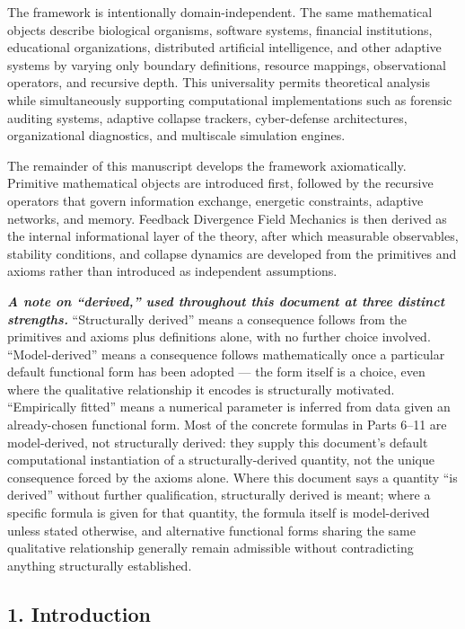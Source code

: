 \documentclass[
]{article}
\begin{document}
The framework is intentionally domain-independent. The same mathematical
objects describe biological organisms, software systems, financial
institutions, educational organizations, distributed artificial
intelligence, and other adaptive systems by varying only boundary
definitions, resource mappings, observational operators, and recursive
depth. This universality permits theoretical analysis while
simultaneously supporting computational implementations such as forensic
auditing systems, adaptive collapse trackers, cyber-defense
architectures, organizational diagnostics, and multiscale simulation
engines.

The remainder of this manuscript develops the framework axiomatically.
Primitive mathematical objects are introduced first, followed by the
recursive operators that govern information exchange, energetic
constraints, adaptive networks, and memory. Feedback Divergence Field
Mechanics is then derived as the internal informational layer of the
theory, after which measurable observables, stability conditions, and
collapse dynamics are developed from the primitives and axioms rather
than introduced as independent assumptions.

\emph{\textbf{A note on ``derived,'' used throughout this document at
three distinct strengths.}} ``Structurally derived'' means a consequence
follows from the primitives and axioms plus definitions alone, with no
further choice involved. ``Model-derived'' means a consequence follows
mathematically once a particular default functional form has been
adopted --- the form itself is a choice, even where the qualitative
relationship it encodes is structurally motivated. ``Empirically
fitted'' means a numerical parameter is inferred from data given an
already-chosen functional form. Most of the concrete formulas in Parts
6--11 are model-derived, not structurally derived: they supply this
document's default computational instantiation of a structurally-derived
quantity, not the unique consequence forced by the axioms alone. Where
this document says a quantity ``is derived'' without further
qualification, structurally derived is meant; where a specific formula
is given for that quantity, the formula itself is model-derived unless
stated otherwise, and alternative functional forms sharing the same
qualitative relationship generally remain admissible without
contradicting anything structurally established.

\hypertarget{introduction}{%
\subsection{1. Introduction}\label{introduction}}
\end{document}
